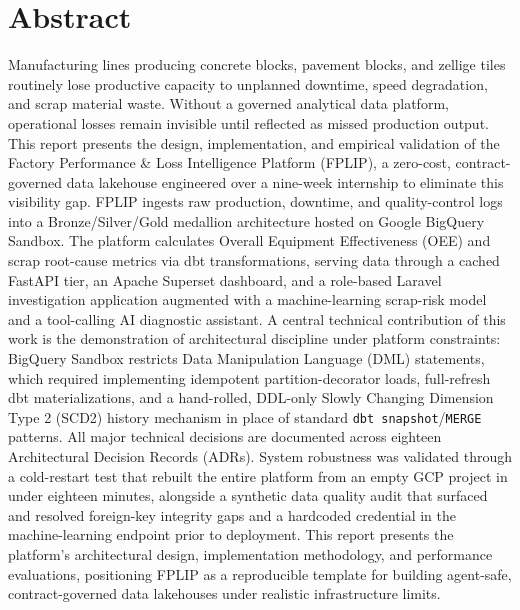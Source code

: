 \documentclass[12pt, a4paper]{report}
\begin{document}
\chapter*{Abstract}
Manufacturing lines producing concrete blocks, pavement blocks, and zellige tiles routinely lose productive capacity to unplanned downtime, speed degradation, and scrap material waste. Without a governed analytical data platform, operational losses remain invisible until reflected as missed production output. This report presents the design, implementation, and empirical validation of the Factory Performance \& Loss Intelligence Platform (FPLIP), a zero-cost, contract-governed data lakehouse engineered over a nine-week internship to eliminate this visibility gap. FPLIP ingests raw production, downtime, and quality-control logs into a Bronze/Silver/Gold medallion architecture hosted on Google BigQuery Sandbox. The platform calculates Overall Equipment Effectiveness (OEE) and scrap root-cause metrics via dbt transformations, serving data through a cached FastAPI tier, an Apache Superset dashboard, and a role-based Laravel investigation application augmented with a machine-learning scrap-risk model and a tool-calling AI diagnostic assistant. A central technical contribution of this work is the demonstration of architectural discipline under platform constraints: BigQuery Sandbox restricts Data Manipulation Language (DML) statements, which required implementing idempotent partition-decorator loads, full-refresh dbt materializations, and a hand-rolled, DDL-only Slowly Changing Dimension Type 2 (SCD2) history mechanism in place of standard \texttt{dbt snapshot}/\texttt{MERGE} patterns. All major technical decisions are documented across eighteen Architectural Decision Records (ADRs). System robustness was validated through a cold-restart test that rebuilt the entire platform from an empty GCP project in under eighteen minutes, alongside a synthetic data quality audit that surfaced and resolved foreign-key integrity gaps and a hardcoded credential in the machine-learning endpoint prior to deployment. This report presents the platform's architectural design, implementation methodology, and performance evaluations, positioning FPLIP as a reproducible template for building agent-safe, contract-governed data lakehouses under realistic infrastructure limits.

\tableofcontents
\listoffigures
\listoftables
\end{document}
